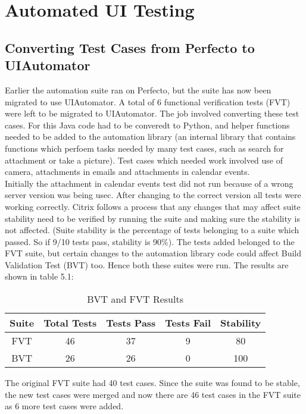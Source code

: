 \setlength\parindent{0pt}

\chapter{Automated UI Testing}

\section{Converting Test Cases from Perfecto to UIAutomator}
Earlier the automation suite ran on Perfecto, but the suite has now been migrated to use UIAutomator. A total of 6 functional verification tests (FVT) were left to be migrated to UIAutomator. The job involved converting these test cases. For this Java code had to be converedt to Python, and helper functions needed to be added to the automation library (an internal library that contains functions which perfoem tasks needed by many test cases, such as search for attachment or take a picture). Test cases which needed work involved use of camera, attachments in emails and attachments in calendar events. \\

Initially the attachment in calendar events test did not run because of a wrong server version was being usec. After changing to the correct version all tests were working correctly. Citrix follows a process that any changes that may affect suite stability need to be verified by running the suite and making sure the stability is not affected. (Suite stability is the percentage of tests belonging to a suite which passed. So if 9/10 tests pass, stability is 90\%). The tests added belonged to the FVT suite, but certain changes to the automation library code could affect Build Validation Test (BVT) too. Hence both these suites were run. The results are shown in table 5.1:

\begin{table}[!h]
\centering
\caption{BVT and FVT Results}
\begin{tabular}{|c|c|c|c|c|}
\hline
Suite & Total Tests & Tests Pass & Tests Fail & Stability \\ \hline
FVT   & 46          & 37         & 9          & 80        \\ \hline
BVT   & 26          & 26         & 0          & 100       \\ \hline         
\end{tabular}
\end{table} 

The original FVT suite had 40 test cases. Since the suite was found to be stable, the new test cases were merged and now there are 46 test cases in the FVT suite as 6 more test cases were added.

